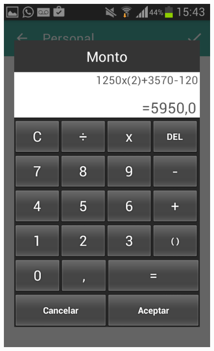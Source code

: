 \begin{figure}[ht]
\centering
\begin{minipage}{.5\textwidth}
\centering
  \includegraphics[scale=0.30,type=png,ext=.png,read=.png]{imagenes/Screenshots/calculator}
  \captionsetup{justification=centering}
  \label{fig:interfazCalculadora}


\end{minipage}
\end{figure}
